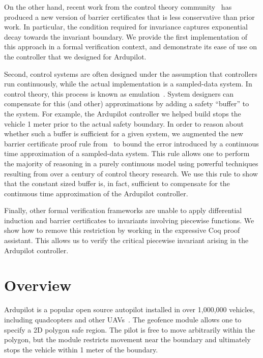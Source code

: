 On the other hand, recent work from the control theory
community~\cite{kong2013barrier,xu15barrier,nguyen16barrier} has produced a
new version of barrier certificates that is less conservative than prior
work. In particular, the condition required for invariance captures
exponential decay towards the invariant boundary. We provide the first
implementation of this approach in a formal verification context, and
demonstrate its ease of use on the controller that we designed for
Ardupilot.

Second, control systems are often designed under the assumption that
controllers run continuously, while the actual implementation is a
sampled-data system. In control theory, this process is known as
emulation~\cite{laila02sampled}. System designers can compensate for this
(and other) approximations by adding a safety ``buffer'' to the system. For
example, the Ardupilot controller we helped build stops the vehicle 1 meter
prior to the actual safety boundary. In order to reason about whether such
a buffer is sufficient for a given system, we augmented the new barrier
certificate proof rule
from~\cite{kong2013barrier,xu15barrier,nguyen16barrier} to bound the error
introduced by a continuous time approximation of a sampled-data
system. This rule allows one to perform the majority of reasoning in a
purely continuous model using powerful techniques resulting from over a
century of control theory research. We use this rule to show that the
constant sized buffer is, in fact, sufficient to compensate for the
continuous time approximation of the Ardupilot controller.

Finally, other formal verification frameworks are unable to apply
differential induction and barrier certificates to invariants involving
piecewise functions.  We show how to remove this restriction by working in
the expressive Coq proof assistant. This allows us to verify the critical
piecewise invariant arising in the Ardupilot controller.

\section{Overview}
\label{sec:exp-smpl-overview}
Ardupilot is a popular open source autopilot installed in over 1,000,000
vehicles, including quadcopters and other UAVs~\cite{ardupilot}. The
geofence module allows one to specify a 2D polygon safe region. The pilot
is free to move arbitrarily within the polygon, but the module restricts
movement near the boundary and ultimately stops the vehicle within 1 meter
of the boundary.

